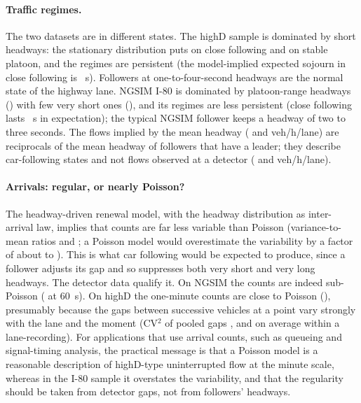 \documentclass[11pt,a4paper]{article}
\numberwithin{equation}{section}
\begin{document}
\paragraph{Traffic regimes.} The two datasets are in different states. The highD sample is dominated by short headways: the stationary distribution puts \hdPiC{} on close following and \hdPiP{} on stable platoon, and the regimes are persistent (the model-implied expected sojourn in close following is \hdSojC~s). Followers at one-to-four-second headways are the normal state of the highway lane.
NGSIM I-80 is dominated by platoon-range headways (\ngPiP) with few very short ones (\ngPiC), and its regimes are less persistent (close following lasts \ngSojC~s in expectation); the typical NGSIM follower keeps a headway of two to three seconds.
The flows implied by the mean headway (\hdFlow{} and \ngFlow{} veh/h/lane) are reciprocals of the mean headway of followers that have a leader; they describe car-following states and not flows observed at a detector (\hdDetFlow{} and \ngDetFlow{} veh/h/lane).

\paragraph{Arrivals: regular, or nearly Poisson?} The headway-driven renewal model, with the headway distribution as inter-arrival law, implies that counts are far less variable than Poisson (variance-to-mean ratios \hdCV{} and \ngCV; a Poisson model would overestimate the variability by a factor of about \hdCVInv{} to \ngCVInv). This is what car following would be expected to produce, since a follower adjusts its gap and so suppresses both very short and very long
headways. The detector data qualify it. On NGSIM the counts are indeed sub-Poisson (\ngDetFanoObs{} at 60~s). On highD the one-minute counts are close to Poisson (\hdDetFanoObs), presumably because the gaps between successive vehicles at a point vary strongly with the lane and the moment (CV$^2$ of pooled gaps \hdDetCV, and \hdDetFanoRen{} on average within a lane-recording).
For applications that use arrival counts, such as queueing and signal-timing analysis, the practical message is that a Poisson model is a reasonable description of highD-type uninterrupted flow at the minute scale, whereas in the I-80 sample it overstates the variability, and that the regularity should be taken from detector gaps, not from followers' headways.
\end{document}
